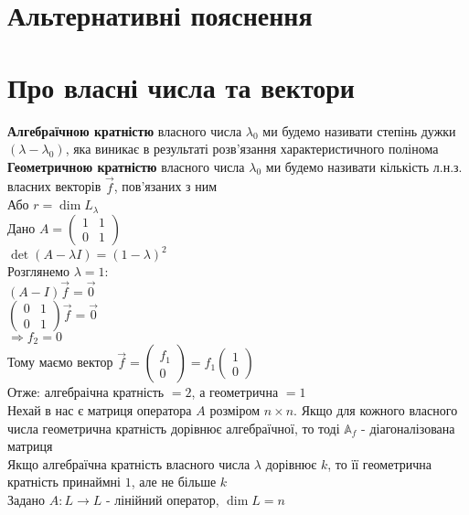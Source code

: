 \documentclass[a4paper, 10pt]{article}
\theoremstyle{theoremdd}
\begin{document}
\iffalse
\section{Альтернативні пояснення}
\section*{Про власні числа та вектори}
 \textbf{Алгебраїчною кратністю} власного числа $\lambda_0$ ми будемо називати степінь дужки $(\lambda - \lambda_0)$, яка виникає в результаті розв'язання характеристичного полінома
\bigskip \\
 \textbf{Геометричною кратністю} власного числа $\lambda_0$ ми будемо називати кількість л.н.з. власних векторів $\vec{f}$, пов'язаних з ним\\
Або $r = \dim L_{\lambda}$
\bigskip \\
\ex{} Дано $A = \begin{pmatrix}
1 & 1 \\
0 & 1
\end{pmatrix}$\\
$\det(A-\lambda I) = (1-\lambda)^2$\\
Розглянемо $\lambda = 1$:\\
$(A-I)\vec{f} = \vec{0}$\\
$\begin{pmatrix}
0 & 1 \\
0 & 1
\end{pmatrix} \vec{f} = \vec{0}$\\
$\Rightarrow f_2 = 0$\\
Тому маємо вектор $\vec{f} = \begin{pmatrix}
f_1 \\ 0
\end{pmatrix} = f_1 \begin{pmatrix}
1 \\ 0
\end{pmatrix}$\\
Отже: алгебраічна кратність $= 2$, а геометрична $= 1$
\bigskip \\
\crl{} Нехай в нас є матриця оператора $A$ розміром $n \times n$. Якщо для кожного власного числа геометрична кратність дорівнює алгебраїчної, то тоді $\mathbb{A}_f$ - діагоналізована матриця
\bigskip \\
\th{} Якщо алгебраїчна кратність власного числа $\lambda$ дорівнює $k$, то її геометрична кратність принаймні $1$, але не більше $k$
\bigskip \\
 Задано $A: L \to L$ - лінійний оператор, $\dim L = n$\\
\end{document}

